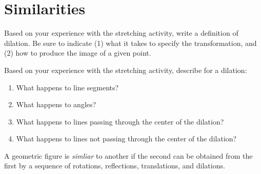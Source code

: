 \newpage

\section{Similarities}
\begin{prob}
Based on your experience with the stretching activity, write a definition of dilation.  Be sure to indicate (1) what it takes to specify the transformation, and (2) how to produce the image of a given point.  
\vspace{0.6in}
\end{prob}

\begin{prob}
Based on your experience with the stretching activity, describe for a dilation: 
\begin{enumerate}
\item What happens to line segments? 
\vspace{0.2in}
\item What happens to angles?  
\vspace{0.2in}
\item What happens to lines passing through the center of the dilation?
\vspace{0.2in}
\item What happens to lines not passing through the center of the dilation?
\vspace{0.2in}
\end{enumerate}
\end{prob}


\begin{definition}
A geometric figure is \emph{simliar} to another if the second can be obtained from the first by a sequence of rotations, reflections, translations, and dilations.  
\end{definition}

